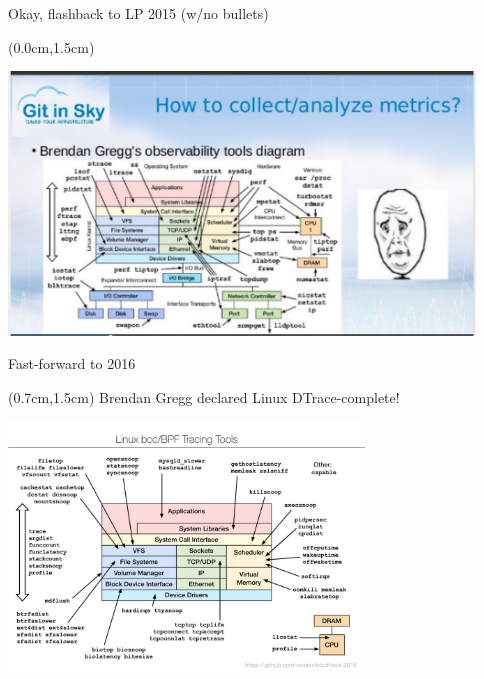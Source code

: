 \documentclass[xetex,14pt,aspectratio=169]{beamer}
\begin{document}
\begin{frame}{Okay, flashback to LP 2015 (w/no bullets)}
\begin{textblock*}{\framewidth-0.8cm}(0.0cm,1.5cm) %
\begin{minipage}{\textwidth}
  \centering
  \includegraphics[height=7cm]{img/2015.png}
\end{minipage}
\end{textblock*}
\end{frame}

\begin{frame}{Fast-forward to 2016}
\begin{textblock*}{\framewidth-0.8cm}(0.7cm,1.5cm) %
Brendan Gregg declared Linux DTrace-complete!
\begin{minipage}{\textwidth}
  \centering
  \includegraphics[height=6.6cm]{img/2016.png}
\end{minipage}
\end{textblock*}
\end{frame}
\end{document}
